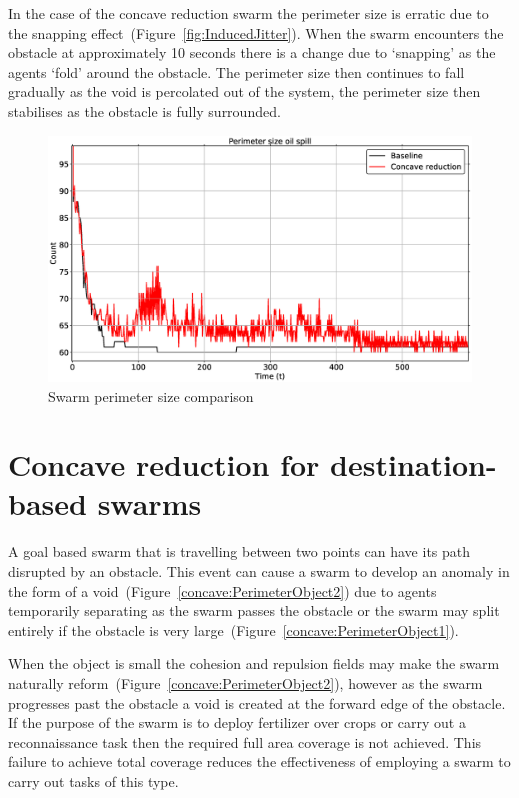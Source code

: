 In the case of the concave reduction swarm the perimeter size is erratic due to the snapping effect~(Figure~\ref{fig:InducedJitter}). When the swarm encounters the obstacle at approximately 10 seconds there is a change due to `snapping' as the agents `fold' around the obstacle. The perimeter size then continues to fall gradually as the void is percolated out of the system, the perimeter size then stabilises as the obstacle is fully surrounded.
\begin{figure}[H]
\begin{center}
\includegraphics[width=14cm]{CHAPTER-7/figures/OilSpillPerimeter8060-1}
\end{center}
\caption{Swarm perimeter size comparison\label{concave:OilSpillPerimeter8060-1}}
\end{figure}

\section{Concave reduction for destination-based swarms}\label{concave:mobileSwarm1}
A goal based swarm that is travelling between two points can have its path disrupted by an obstacle. This event can cause a swarm to develop an anomaly in the form of a void~(Figure~\ref{concave:PerimeterObject2}) due to agents temporarily separating as the swarm passes the obstacle or the swarm may split entirely if the obstacle is very large~(Figure~\ref{concave:PerimeterObject1}). 

When the object is small the cohesion and repulsion fields may make the swarm naturally reform~(Figure~\ref{concave:PerimeterObject2}), however as the swarm progresses past the obstacle a void is created at the forward edge of the obstacle. If the purpose of the swarm is to deploy fertilizer over crops or carry out a reconnaissance task then the required full area coverage is not achieved. This failure to achieve total coverage reduces the effectiveness of employing a swarm to carry out tasks of this type.

